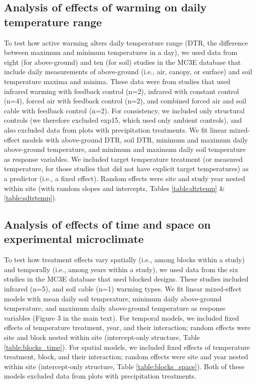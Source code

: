 \documentclass{article}
\begin{document}
\subsection* {Analysis of effects of warming on daily temperature range}
To test how active warming alters daily temperature range (DTR, the difference between maximum and minimum temperatures in a day), we used data from eight (for above-ground) and ten (for soil) studies in the MC3E database that include daily measurements of above-ground (i.e., air, canopy, or surface) and soil temperature maxima and minima. These data were from studies that used infrared warming with feedback control (n=2), infrared with constant control (n=4), forced air with feedback control (n=2), and combined forced air and soil cable with feedback control (n=2).  For consistency, we included only structural controls (we therefore excluded exp15, which used only ambient controls), and also excluded data from plots with precipitation treatments. We fit linear mixed-effect models with above-ground DTR, soil DTR, minimum and maximum daily above-ground temperature, and minimum and maximum daily soil temperature as response variables. We included target temperature treatment (or measured temperature, for those studies that did not have explicit target temperatures) as a predictor (i.e., a fixed effect). Random effects were site and study year nested within site (with random slopes and intercepts, Tables \ref{table:dtrtemp} \& \ref{table:sdtrtemp}). 

\subsection* {Analysis of effects of time and space on experimental microclimate}
To test how treatment effects vary spatially (i.e., among blocks within a study) and temporally (i.e., among years within a study), we used data from the six studies in the MC3E database that used blocked designs. These studies included infrared (n=5), and soil cable (n=1) warming types.  We fit linear mixed-effect models with mean daily soil temperature, minimum daily above-ground temperature, and maximum daily above-ground temperature as response variables (Figure 3 in the main text). For temporal models, we included fixed effects of temperature treatment, year, and their interaction; random effects were site and block nested within site (intercept-only structure, Table \ref{table:blocks_time}). For spatial models, we included fixed effects of temperature treatment, block, and their interaction; random effects were site and year nested within site (intercept-only structure, Table \ref{table:blocks_space}). Both of these models excluded data from plots with precipitation treatments. 
\end{document}
